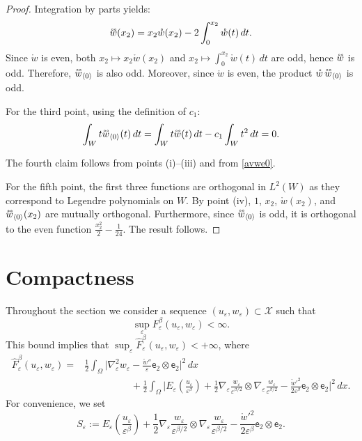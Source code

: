 \documentclass[a4, 11pt, reqno, final]{amsart}
\newcommand{\calX}{\mathcal{X}}
\newcommand\e{\varepsilon}
\newcommand\ringring[1]{%
	{%
		\mathop{\kern0pt #1}\limits^{%
			\vbox to-1.85ex{
				\kern-2ex %
				\hbox to 0pt{\hss\normalfont\kern.1em \r{}\kern-.45em \r{}\hss}%
				\vss %
			}%
		}%
	}%
}
\theoremstyle{plain}%
\newcommand{\QED}{\hspace{1ex}\hfill$\blacksquare$\vspace{2ex}}
\begin{document}
	\begin{proof}
		Integration by parts yields:
		$$
		\ringring{w}(x_2) = x_2 \mathring{w}(x_2) - 2 \int_0^{x_2} \mathring{w}(t) \, dt.
		$$
		Since $\mathring{w}$ is even, both $x_2 \mapsto x_2 \mathring{w}(x_2)$ and $x_2 \mapsto \int_0^{x_2} \mathring{w}(t) \, dt$ are odd, hence $\ringring{w}$ is odd. Therefore, $\ringring{w}_{\langle 0 \rangle}$ is also odd. Moreover, since $\mathring{w}$ is even, the product $\mathring{w} \, \ringring{w}_{\langle 0 \rangle}$ is odd.

		For the third point, using the definition of $c_1$:
		$$
		\int_W t \ringring{w}_{\langle 0 \rangle}(t) \, dt = \int_W t \ringring{w}(t) \, dt - c_1 \int_W t^2 \, dt = 0.
		$$

		The fourth claim follows from points (i)–(iii) and from \eqref{avwe0}.

		For the fifth point, the first three functions are orthogonal in $L^2(W)$ as they correspond to Legendre polynomials on $W$. By point (iv), $1$, $x_2$, $\mathring{w}(x_2)$, and $\ringring{w}_{\langle 0 \rangle}(x_2)$ are mutually orthogonal. Furthermore, since $\ringring{w}_{\langle 0 \rangle}$ is odd, it is orthogonal to the even function $\frac{x_2^2}{2} - \frac{1}{24}$. The result follows.
	\end{proof}


	\section{Compactness}\label{sec:comp}

	Throughout the section we consider a sequence  $(u_\e, w_{\e})\subset \calX$ such that
	\begin{equation}\label{cmp00}
		\sup_{\e} F_{\e}^{\beta}(u_\e, w_{\e}) <\infty.
	\end{equation}
	This bound implies that  $\sup_{\e} \hat{F}_{\e}^{\beta}(u_\e,w_\e)<+\infty$, where
	$$	 \begin{aligned}\hat{F}_{\e}^{\beta}(u_\e,w_\e) = & \frac12\int_\Omega  \Big| \nabla^2_\e w_\e- \frac{\mathring{w} ''}{\e} \mathsf{e}_2 \otimes \mathsf{e}_2\Big|^2 \, dx \\ & \hspace{2cm}+ \frac12\int_\Omega \Big|E_\e (\frac{u_\e}{\e^\beta}) + \frac12 \nabla_\e \frac{w_\e}{\e^{\beta/2}}\otimes \nabla_\e\frac{w_\e}{\e^{\beta/2}} -  \frac{\mathring{w}'^2}{2\e^\beta} \mathsf{e}_2 \otimes \mathsf{e}_2 \Big|^2\, dx. \end{aligned}
	$$
	For convenience, we set
	\begin{equation}\label{defSe}
		S_\e:=E_\e (\frac{u_\e}{\e^\beta}) + \frac12 \nabla_\e \frac{w_\e}{\e^{\beta/2}}\otimes \nabla_\e\frac{w_\e}{\e^{\beta/2}} -  \frac{\mathring{w}'^2}{2\e^\beta} \mathsf{e}_2 \otimes \mathsf{e}_2.
	\end{equation}
\end{document}
